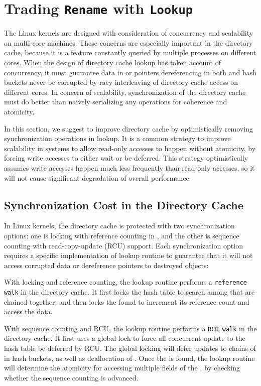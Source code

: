 \section{Trading {\tt Rename} with {\tt Lookup}}
\label{sec:dcache:update}

The Linux kernels are designed with consideration of concurrency and
scalability on multi-core machines.
These concerns are especially important in the directory cache,
because it is a feature constantly queried by multiple processes on different cores.
When the design of directory cache lookup has taken account of
concurrency,
it must guarantee data in \dentries{} or pointers dereferencing in both \dentries{} and hash buckets never be corrupted
by racy interleaving of directory cache access on different cores.
In concern of scalability,
synchronization of the directory cache must do better than naively serializing any operations for coherence and atomicity.

In this section, we suggest to improve directory cache by optimistically removing synchronization operations in lookup.
It is a common strategy to improve scalability in systems
to allow read-only accesses to happen without atomicity, by forcing write accesses to either wait or be deferred.
This strategy optimistically assumes write accesses happen much less frequently
than read-only accesses,
so it will not cause significant degradation of overall performance.

\subsection{Synchronization Cost in the Directory Cache}

In Linux kernels, the directory cache is protected with two synchronization options:
one is locking with reference counting in \dentries{},
and the other is sequence counting with read-copy-update (RCU) support.
Each synchronization option requires a specific implementation of lookup routine
to guarantee that it will not access corrupted data or dereference pointers to destroyed objects:

\begin{compactitem}

\item With locking and reference counting,
the lookup routine performs a {\tt reference walk} in the directory cache.
It first locks the hash table to search among \dentries{} that are chained together,
and then locks the found \dentry{} to increment its reference count
and access the data.

\item With sequence counting and RCU,
the lookup routine performs a {\tt RCU walk} in the directory cache.
It first uses a global lock to force all concurrent update to the hash table be
deferred by RCU.
The global locking will defer updates to chains of \dentries{} in hash buckets,
as well as deallocation of \dentries{}.
Once the \dentry{} is found, the lookup routine will determine the atomicity
for accessing multiple fields of the \dentry{},
by checking whether the sequence counting is advanced.

\end{compactitem}

